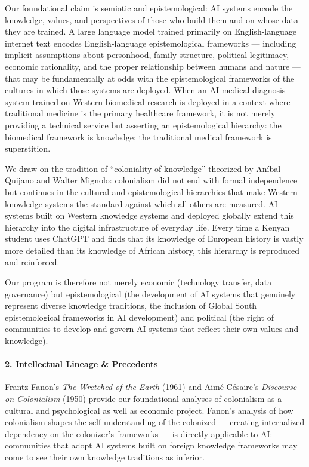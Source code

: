 Our foundational claim is semiotic and epistemological: AI systems
encode the knowledge, values, and perspectives of those who build them
and on whose data they are trained. A large language model trained
primarily on English-language internet text encodes English-language
epistemological frameworks --- including implicit assumptions about
personhood, family structure, political legitimacy, economic
rationality, and the proper relationship between humans and nature ---
that may be fundamentally at odds with the epistemological frameworks of
the cultures in which those systems are deployed. When an AI medical
diagnosis system trained on Western biomedical research is deployed in a
context where traditional medicine is the primary healthcare framework,
it is not merely providing a technical service but asserting an
epistemological hierarchy: the biomedical framework is knowledge; the
traditional medical framework is superstition.

We draw on the tradition of ``coloniality of knowledge'' theorized by
Aníbal Quijano and Walter Mignolo: colonialism did not end with formal
independence but continues in the cultural and epistemological
hierarchies that make Western knowledge systems the standard against
which all others are measured. AI systems built on Western knowledge
systems and deployed globally extend this hierarchy into the digital
infrastructure of everyday life. Every time a Kenyan student uses
ChatGPT and finds that its knowledge of European history is vastly more
detailed than its knowledge of African history, this hierarchy is
reproduced and reinforced.

Our program is therefore not merely economic (technology transfer, data
governance) but epistemological (the development of AI systems that
genuinely represent diverse knowledge traditions, the inclusion of
Global South epistemological frameworks in AI development) and political
(the right of communities to develop and govern AI systems that reflect
their own values and knowledge).

\paragraph{2. Intellectual Lineage \&
Precedents}\label{intellectual-lineage-precedents-47}

Frantz Fanon's \emph{The Wretched of the Earth} (1961) and Aimé
Césaire's \emph{Discourse on Colonialism} (1950) provide our
foundational analyses of colonialism as a cultural and psychological as
well as economic project. Fanon's analysis of how colonialism shapes the
self-understanding of the colonized --- creating internalized dependency
on the colonizer's frameworks --- is directly applicable to AI:
communities that adopt AI systems built on foreign knowledge frameworks
may come to see their own knowledge traditions as inferior.

